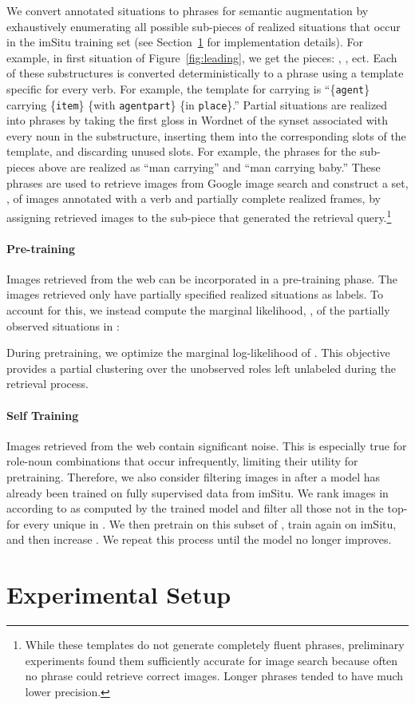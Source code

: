 \documentclass[10pt,twocolumn,letterpaper]{article}
\begin{document}
We convert annotated situations to phrases for semantic augmentation by exhaustively enumerating all possible sub-pieces of realized situations that occur in the imSitu training set (see Section~\ref{sec:setup} for implementation details). 
For example, in first situation of Figure~\ref{fig:leading}, we get the pieces: {\small },
{\small}, ect.
Each of these substructures is converted deterministically to a phrase using a template specific for every verb. 
For example, the template for carrying is ``\{\texttt{agent}\} carrying \{\texttt{item}\} \{with \texttt{agentpart}\} \{in \texttt{place}\}.''
Partial situations are realized into phrases by taking the first gloss in Wordnet of the synset associated with every noun in the substructure, inserting them into the corresponding slots of the template, and discarding unused slots.
For example, the phrases for the sub-pieces above are realized as ``man carrying'' and ``man carrying baby.'' 
These phrases are used to retrieve images from Google image search and construct a set, , of images annotated with a verb and partially complete realized frames, by assigning retrieved images to the sub-piece that generated the retrieval query.\footnote{While these templates do not generate completely fluent phrases, preliminary experiments found them sufficiently accurate for image search because often no phrase could retrieve correct images. Longer phrases tended to have much lower precision.}


\paragraph{Pre-training}
Images retrieved from the web can be incorporated in a pre-training phase.
The images retrieved only have partially specified realized situations as labels. 
To account for this, we instead compute the marginal likelihood, , of the partially observed situations in :

During pretraining, we optimize the marginal log-likelihood of .
This objective provides a partial clustering over the unobserved roles left unlabeled during the retrieval process. 

\paragraph{Self Training}
Images retrieved from the web contain significant noise. 
This is especially true for role-noun combinations that occur infrequently, limiting their utility for pretraining. 
Therefore, we also consider filtering images in  after a model has already been trained on fully supervised data from imSitu. 
We rank images in  according to  as computed by the trained model and filter all those not in the top- for every unique  in .
We then pretrain on this subset of , train again on imSitu, and then increase . 
We repeat this process until the model no longer improves. \section{Experimental Setup}
\label{sec:setup}
\end{document}
